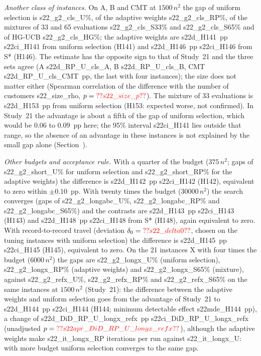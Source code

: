 \emph{Another class of instances.} On A, B and CMT at $1500\,n^2$ the gap of uniform selection is \num{s22_g2_cls_U}\%, of the adaptive weights \num{s22_g2_cls_RP}\%, of the mixtures of 33 and 65 evaluations \num{s22_g2_cls_S33}\% and \num{s22_g2_cls_S65}\% and of HG-UCB \num{s22_g2_cls_HG}\%; the adaptive weights are \num{s22d_H141}~pp \num{s22ci_H141} from uniform selection (H141) and \num{s22d_H146}~pp \num{s22ci_H146} from S* (H146). The estimate has the opposite sign to that of Study~21 and the three sets agree (A \num{s22d_RP_U_cls_A}, B \num{s22d_RP_U_cls_B}, CMT \num{s22d_RP_U_cls_CMT}~pp, the last with four instances); the size does not matter either (Spearman correlation of the difference with the number of customers \num{s22_size_rho}, $p=\num{s22_size_p}$). The mixture of 33 evaluations is \num{s22d_H153}~pp from uniform selection (H153: expected worse, not confirmed). In Study~21 the advantage is about a fifth of the gap of uniform selection, which would be 0.06 to 0.09~pp here; the 95\% interval \num{s22ci_H141} lies outside that range, so the absence of an advantage in these instances is not explained by the small gap alone (Section~).

\emph{Other budgets and acceptance rule.} With a quarter of the budget ($375\,n^2$; gaps of \num{s22_g2_short_U}\% for uniform selection and \num{s22_g2_short_RP}\% for the adaptive weights) the difference is \num{s22d_H142}~pp \num{s22ci_H142} (H142), equivalent to zero within $\pm0.10$~pp. With twenty times the budget ($30000\,n^2$) the search converges (gaps of \num{s22_g2_longabc_U}\%, \num{s22_g2_longabc_RP}\% and \num{s22_g2_longabc_S65}\%) and the contrasts are \num{s22d_H143}~pp \num{s22ci_H143} (H143) and \num{s22d_H148}~pp \num{s22ci_H148} from S* (H148), again equivalent to zero. With record-to-record travel (deviation $\delta_0=\num{s22_delta0}$, chosen on the tuning instances with uniform selection) the difference is \num{s22d_H145}~pp \num{s22ci_H145} (H145), equivalent to zero. On the 21 instances X with four times the budget ($6000\,n^2$) the gaps are \num{s22_g2_longx_U}\% (uniform selection), \num{s22_g2_longx_RP}\% (adaptive weights) and \num{s22_g2_longx_S65}\% (mixture), against \num{s22_g2_refx_U}\%, \num{s22_g2_refx_RP}\% and \num{s22_g2_refx_S65}\% on the same instances at $1500\,n^2$ (Study~21): the difference between the adaptive weights and uniform selection goes from the advantage of Study~21 to \num{s22d_H144}~pp \num{s22ci_H144} (H144; minimum detectable effect \num{s22mde_H144}~pp), a change of \num{s22d_DiD_RP_U_longx_refx}~pp \num{s22ci_DiD_RP_U_longx_refx} (unadjusted $p=\num{s22apr_DiD_RP_U_longx_refx}$), although the adaptive weights make \num{s22_it_longx_RP} iterations per run against \num{s22_it_longx_U}: with more budget uniform selection converges to the same gap.


